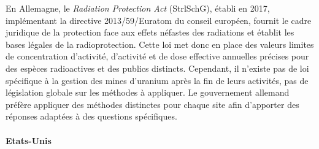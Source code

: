 \documentclass{article}
\begin{document}
En Allemagne, le \emph{Radiation Protection Act} (StrlSchG), établi en 2017, implémentant la directive 2013/59/Euratom du conseil européen, fournit le cadre juridique de la protection face aux effets néfastes des radiations et établit les bases légales de la radioprotection.
Cette loi met donc en place des valeurs limites de concentration d’activité, d’activité et de dose effective annuelles précises pour des espèces radioactives et des publics distincts. 
Cependant, il n’existe pas de loi spécifique à la gestion des mines d’uranium après la fin de leurs activités, pas de législation globale sur les méthodes à appliquer. Le gouvernement allemand préfère appliquer des méthodes distinctes pour chaque site afin d’apporter des réponses adaptées à des questions spécifiques.


\paragraph{Etats-Unis \\ \\}
\end{document}
